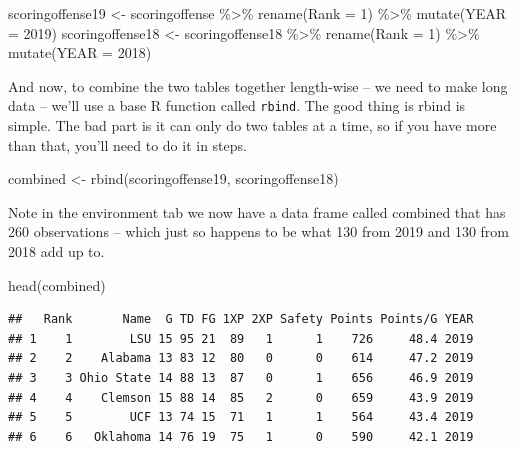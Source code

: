 \documentclass[
]{book}
\newenvironment{Shaded}{\begin{snugshade}}{\end{snugshade}}
\newcommand{\AttributeTok}[1]{\textcolor[rgb]{0.77,0.63,0.00}{#1}}
\newcommand{\DecValTok}[1]{\textcolor[rgb]{0.00,0.00,0.81}{#1}}
\newcommand{\FunctionTok}[1]{\textcolor[rgb]{0.00,0.00,0.00}{#1}}
\newcommand{\NormalTok}[1]{#1}
\newcommand{\OtherTok}[1]{\textcolor[rgb]{0.56,0.35,0.01}{#1}}
\newcommand{\SpecialCharTok}[1]{\textcolor[rgb]{0.00,0.00,0.00}{#1}}
\begin{document}
\begin{Shaded}
\begin{Highlighting}[]
\NormalTok{scoringoffense19 }\OtherTok{\textless{}{-}}\NormalTok{ scoringoffense }\SpecialCharTok{\%\textgreater{}\%} \FunctionTok{rename}\NormalTok{(}\AttributeTok{Rank =} \DecValTok{1}\NormalTok{) }\SpecialCharTok{\%\textgreater{}\%} \FunctionTok{mutate}\NormalTok{(}\AttributeTok{YEAR =} \DecValTok{2019}\NormalTok{)}
\NormalTok{scoringoffense18 }\OtherTok{\textless{}{-}}\NormalTok{ scoringoffense18 }\SpecialCharTok{\%\textgreater{}\%} \FunctionTok{rename}\NormalTok{(}\AttributeTok{Rank =} \DecValTok{1}\NormalTok{) }\SpecialCharTok{\%\textgreater{}\%} \FunctionTok{mutate}\NormalTok{(}\AttributeTok{YEAR =} \DecValTok{2018}\NormalTok{)}
\end{Highlighting}
\end{Shaded}

And now, to combine the two tables together length-wise -- we need to make long data -- we'll use a base R function called \texttt{rbind}. The good thing is rbind is simple. The bad part is it can only do two tables at a time, so if you have more than that, you'll need to do it in steps.

\begin{Shaded}
\begin{Highlighting}[]
\NormalTok{combined }\OtherTok{\textless{}{-}} \FunctionTok{rbind}\NormalTok{(scoringoffense19, scoringoffense18)}
\end{Highlighting}
\end{Shaded}

Note in the environment tab we now have a data frame called combined that has 260 observations -- which just so happens to be what 130 from 2019 and 130 from 2018 add up to.

\begin{Shaded}
\begin{Highlighting}[]
\FunctionTok{head}\NormalTok{(combined)}
\end{Highlighting}
\end{Shaded}

\begin{verbatim}
##   Rank       Name  G TD FG 1XP 2XP Safety Points Points/G YEAR
## 1    1        LSU 15 95 21  89   1      1    726     48.4 2019
## 2    2    Alabama 13 83 12  80   0      0    614     47.2 2019
## 3    3 Ohio State 14 88 13  87   0      1    656     46.9 2019
## 4    4    Clemson 15 88 14  85   2      0    659     43.9 2019
## 5    5        UCF 13 74 15  71   1      1    564     43.4 2019
## 6    6   Oklahoma 14 76 19  75   1      0    590     42.1 2019
\end{verbatim}
\end{document}
